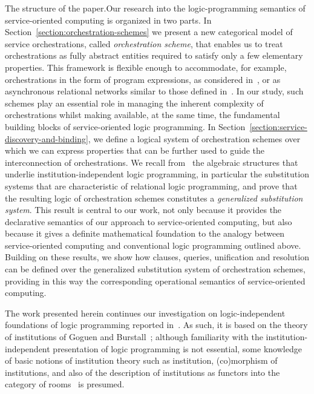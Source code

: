 \documentclass{LMCS}
\begin{document}
\begin{minisection}{The structure of the paper.}Our research into the logic-programming semantics of service-oriented computing is organized in two parts.
  In Section~\ref{section:orchestration-schemes} we present a new categorical model of service orchestrations, called \emph{orchestration scheme}, that enables us to treat orchestrations as fully abstract entities required to satisfy only a few elementary properties.
  This framework is flexible enough to accommodate, for example, orchestrations in the form of program expressions, as considered in~\cite{Fiadeiro:The-many-faces-of-complexity-in-software-design-2012}, or as asynchronous relational networks similar to those defined in~\cite{Fiadeiro-Lopes:An-interface-theory-for-service-oriented-design-2013}.
  In our study, such schemes play an essential role in managing the inherent complexity of orchestrations whilst making available, at the same time, the fundamental building blocks of service-oriented logic programming.
  In Section~\ref{section:service-discovery-and-binding}, we define a logical system of orchestration schemes over which we can express properties that can be further used to guide the interconnection of orchestrations.
  We recall from~\cite{Tutu-Fiadeiro:Institution-independent-logic-programming-2015} the algebraic structures that underlie institution-independent logic programming, in particular the substitution systems that are characteristic of relational logic programming, and prove that the resulting logic of orchestration schemes constitutes a \emph{generalized substitution system}.
  This result is central to our work, not only because it provides the declarative semantics of our approach to service-oriented computing, but also because it gives a definite mathematical foundation to the analogy between service-oriented computing and conventional logic programming outlined above.
  Building on these results, we show how clauses, queries, unification and resolution can be defined over the generalized substitution system of orchestration schemes, providing in this way the corresponding operational semantics of service-oriented computing.
\end{minisection}

The work presented herein continues our investigation on logic-independent foundations of logic programming reported in~\cite{Tutu-Fiadeiro:Institution-independent-logic-programming-2015}. As such, it is based on the theory of institutions of Goguen and Burstall~\cite{Goguen-Burstall:Institutions-1992}; although familiarity with the institution-independent presentation of logic programming is not essential, some knowledge of basic notions of institution theory such as institution, (co)morphism of institutions, and also of the description of institutions as functors into the category of rooms~\cite{Diaconescu:Institution-Independent-Model-Theory-2008,Sannella-Tarlecki:Foundations-of-Algebraic-Specification-2011} is presumed.
\end{document}
